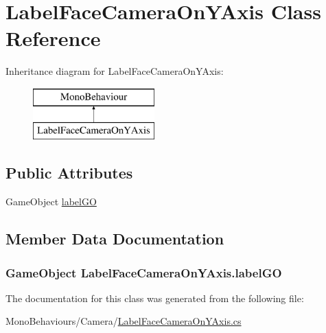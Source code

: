 \hypertarget{class_label_face_camera_on_y_axis}{}\section{Label\+Face\+Camera\+On\+Y\+Axis Class Reference}
\label{class_label_face_camera_on_y_axis}
Inheritance diagram for Label\+Face\+Camera\+On\+Y\+Axis\+:\begin{figure}[H]
\begin{center}
\leavevmode
\includegraphics[height=2.000000cm]{class_label_face_camera_on_y_axis}
\end{center}
\end{figure}
\subsection*{Public Attributes}
\begin{DoxyCompactItemize}
\item 
Game\+Object \hyperlink{class_label_face_camera_on_y_axis_af50f5c5422c9057e75cee8f5917d9d83}{label\+GO}
\end{DoxyCompactItemize}


\subsection{Member Data Documentation}
\subsubsection[{\texorpdfstring{label\+GO}{labelGO}}]{\setlength{\rightskip}{0pt plus 5cm}Game\+Object Label\+Face\+Camera\+On\+Y\+Axis.\+label\+GO}\hypertarget{class_label_face_camera_on_y_axis_af50f5c5422c9057e75cee8f5917d9d83}{}\label{class_label_face_camera_on_y_axis_af50f5c5422c9057e75cee8f5917d9d83}


The documentation for this class was generated from the following file\+:\begin{DoxyCompactItemize}
\item 
Mono\+Behaviours/\+Camera/\hyperlink{_label_face_camera_on_y_axis_8cs}{Label\+Face\+Camera\+On\+Y\+Axis.\+cs}\end{DoxyCompactItemize}
